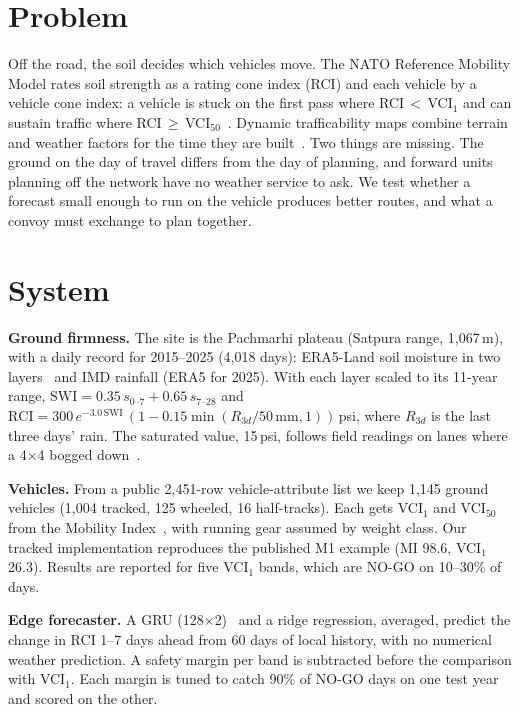 \documentclass[sigconf]{acmart}
\begin{document}
\section{Problem}
Off the road, the soil decides which vehicles move. The NATO Reference Mobility Model
rates soil strength as a rating cone index (RCI) and each vehicle by a vehicle cone index:
a vehicle is stuck on the first pass where RCI\,$<$\,VCI$_1$ and can sustain traffic where
RCI\,$\geq$\,VCI$_{50}$~\cite{rosca2018}. Dynamic trafficability maps combine terrain and
weather factors for the time they are built~\cite{liu2025}. Two things are missing. The
ground on the day of travel differs from the day of planning, and forward units planning
off the network have no weather service to ask. We test whether a forecast small enough to
run on the vehicle produces better routes, and what a convoy must exchange to plan together.

\section{System}
\textbf{Ground firmness.} The site is the Pachmarhi plateau (Satpura range, 1,067\,m), with
a daily record for 2015--2025 (4,018 days): ERA5-Land soil moisture in two
layers~\cite{munoz2021} and IMD rainfall (ERA5 for 2025). With each layer scaled to its 11-year range,
$\mathrm{SWI}=0.35\,s_{0\text{--}7}+0.65\,s_{7\text{--}28}$ and
$\mathrm{RCI}=300\,e^{-3.0\,\mathrm{SWI}}\,(1-0.15\min(R_{3d}/50\,\mathrm{mm},1))$\,psi, where
$R_{3d}$ is the last three days' rain. The saturated value, 15\,psi, follows field readings
on lanes where a 4$\times$4 bogged down~\cite{rosca2018}.

\textbf{Vehicles.} From a public 2,451-row vehicle-attribute list we keep 1,145 ground
vehicles (1,004 tracked, 125 wheeled, 16 half-tracks). Each gets VCI$_1$
and VCI$_{50}$ from the Mobility Index~\cite{rosca2018,ciobotaru2009}, with running gear
assumed by weight class. Our tracked implementation reproduces the published M1 example
(MI 98.6, VCI$_1$ 26.3). Results are reported for five VCI$_1$ bands, which are NO-GO on
10--30\% of days.

\textbf{Edge forecaster.} A GRU (128$\times$2)~\cite{cho2014} and a ridge regression,
averaged, predict the change in RCI 1--7 days ahead from 60 days of local history, with no
numerical weather prediction. A safety margin per band is subtracted before the comparison
with VCI$_1$. Each margin is tuned to catch 90\% of NO-GO days on one test year and scored
on the other.
\end{document}
